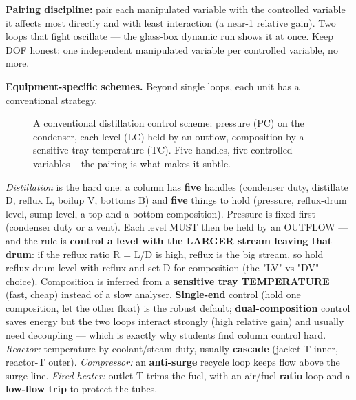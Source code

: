 \documentclass[11pt,a4paper]{article}
\begin{document}
\textbf{Pairing discipline:} pair each manipulated variable with the
controlled variable it affects most directly and with least interaction
(a near-1 relative gain). Two loops that fight oscillate --- the
glass-box dynamic run shows it at once. Keep DOF honest: one independent
manipulated variable per controlled variable, no more.

\textbf{Equipment-specific schemes.} Beyond single loops, each unit has
a conventional strategy.

\begin{figure}[h]\centering
{}\caption{A conventional distillation control scheme: pressure (PC) on the condenser, each level (LC) held by an outflow, composition by a sensitive tray temperature (TC). Five handles, five controlled variables -- the pairing is what makes it subtle.}\end{figure}

\emph{Distillation} is the hard one: a column has \textbf{five} handles
(condenser duty, distillate D, reflux L, boilup V, bottoms B) and
\textbf{five} things to hold (pressure, reflux-drum level, sump level, a
top and a bottom composition). Pressure is fixed first (condenser duty
or a vent). Each level MUST then be held by an OUTFLOW --- and the rule
is \textbf{control a level with the LARGER stream leaving that drum}: if
the reflux ratio R = L/D is high, reflux is the big stream, so hold
reflux-drum level with reflux and set D for composition (the "LV" vs
"DV" choice). Composition is inferred from a \textbf{sensitive tray
TEMPERATURE} (fast, cheap) instead of a slow analyser.
\textbf{Single-end} control (hold one composition, let the other float)
is the robust default; \textbf{dual-composition} control saves energy
but the two loops interact strongly (high relative gain) and usually
need decoupling --- which is exactly why students find column control
hard. \emph{Reactor:} temperature by coolant/steam duty, usually
\textbf{cascade} (jacket-T inner, reactor-T outer). \emph{Compressor:}
an \textbf{anti-surge} recycle loop keeps flow above the surge line.
\emph{Fired heater:} outlet T trims the fuel, with an air/fuel
\textbf{ratio} loop and a \textbf{low-flow trip} to protect the tubes.
\end{document}
